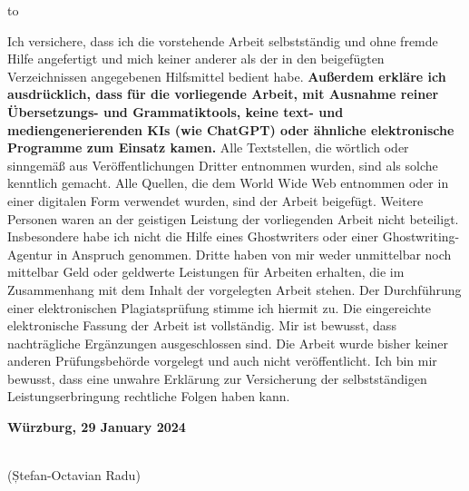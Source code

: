 \documentclass[runningheads,a4paper]{uwsese}
\newcommand{\authorName}{Ștefan-Octavian Radu}
\newcommand{\place}{Würzburg}
\newcommand{\submissionTime}{29 January 2024}
\begin{document}
\newpage




\clearpage
\hbox to \textwidth{\hrulefill}
\par

\noindent Ich versichere, dass ich die vorstehende Arbeit selbstständig und ohne fremde Hilfe angefertigt und mich keiner anderer als der in den beigefügten Verzeichnissen angegebenen Hilfsmittel bedient habe.
\textbf{Außerdem erkläre ich ausdrücklich, dass für die vorliegende Arbeit, mit Ausnahme reiner Übersetzungs- und Grammatiktools, keine text- und mediengenerierenden KIs (wie ChatGPT) oder ähnliche elektronische Programme zum Einsatz kamen.}
Alle Textstellen, die wörtlich oder sinngemäß aus Veröffentlichungen Dritter entnommen wurden, sind als solche kenntlich gemacht.
Alle Quellen, die dem World Wide Web entnommen oder in einer digitalen Form verwendet wurden, sind der Arbeit beigefügt.
\bigbreak
\noindent Weitere Personen waren an der geistigen Leistung der vorliegenden Arbeit nicht beteiligt.
Insbesondere habe ich nicht die Hilfe eines Ghostwriters oder einer Ghostwriting-Agentur in Anspruch genommen.
Dritte haben von mir weder unmittelbar noch mittelbar Geld oder geldwerte Leistungen für Arbeiten erhalten, die im Zusammenhang mit dem Inhalt der vorgelegten Arbeit stehen.
\bigbreak
\noindent Der Durchführung einer elektronischen Plagiatsprüfung stimme ich hiermit zu.
Die eingereichte elektronische Fassung der Arbeit ist vollständig.
Mir ist bewusst, dass nach\-träg\-li\-che Ergänzungen ausgeschlossen sind.
\bigbreak
\noindent Die Arbeit wurde bisher keiner anderen Prüfungsbehörde vorgelegt und auch nicht veröffentlicht.
Ich bin mir bewusst, dass eine unwahre Erklärung zur Versicherung der selbstständigen Leistungserbringung rechtliche Folgen haben kann.

\vspace*{2\baselineskip}

\noindent\textbf{\place, \submissionTime}
\vspace{1.5cm}

\noindent\dotfill\hspace*{8.0cm}\\
\noindent\hspace*{2cm}(\authorName) %


\thispagestyle{empty}
\end{document}
